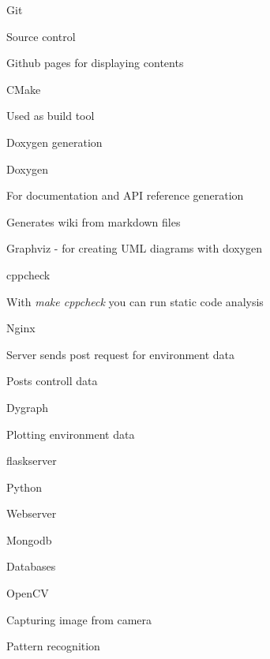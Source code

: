 \begin{DoxyItemize}
\item Git
\begin{DoxyItemize}
\item Source control
\item Github pages for displaying contents
\end{DoxyItemize}
\item C\+Make
\begin{DoxyItemize}
\item Used as build tool
\item Doxygen generation
\end{DoxyItemize}
\item Doxygen
\begin{DoxyItemize}
\item For documentation and A\+PI reference generation
\item Generates wiki from markdown files
\item Graphviz -\/ for creating U\+ML diagrams with doxygen
\end{DoxyItemize}
\item cppcheck
\begin{DoxyItemize}
\item With {\itshape make cppcheck} you can run static code analysis
\end{DoxyItemize}
\item Nginx
\begin{DoxyItemize}
\item Server sends post request for environment data
\item Posts controll data
\end{DoxyItemize}
\item Dygraph
\begin{DoxyItemize}
\item Plotting environment data
\end{DoxyItemize}
\item flaskserver
\begin{DoxyItemize}
\item 
\end{DoxyItemize}
\item Python
\begin{DoxyItemize}
\item Webserver
\end{DoxyItemize}
\item Mongodb
\begin{DoxyItemize}
\item Databases
\end{DoxyItemize}
\item Open\+CV
\begin{DoxyItemize}
\item Capturing image from camera
\item Pattern recognition 
\end{DoxyItemize}
\end{DoxyItemize}